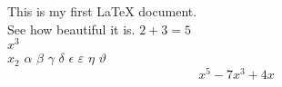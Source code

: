 This is my first LaTeX document. \\ See how beautiful it is.
\blindtext[2]	%
$2+3=5$\\	%
$x^{3}$\\
$x_{2}$	
$\alpha$
$\beta$
$\gamma$
$\delta$
$\epsilon$
$\varepsilon$
$\eta$
$\vartheta$
\begin{equation}
	x^5-7x^3+4x	
\end{equation}